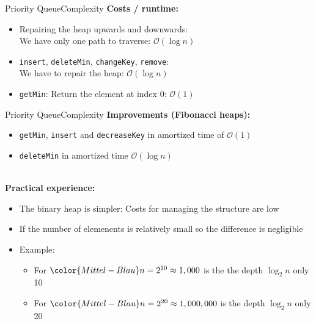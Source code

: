\begin{frame}{Priority Queue}{Complexity}
  \textbf{Costs / runtime:}
  \begin{itemize}
    \item
      Repairing the heap upwards and downwards:\\
      We have only one path to traverse: $\mathcal{O}(\log n)$
    \item
      {\color{Mittel-Blau}\texttt{insert}},
      {\color{Mittel-Blau}\texttt{deleteMin}},
      {\color{Mittel-Blau}\texttt{changeKey}},
      {\color{Mittel-Blau}\texttt{remove}}:\\
      We have to repair the heap: $\mathcal{O}(\log n)$
    \item
      {\color{Mittel-Blau}\texttt{getMin}}:
      Return the element at index 0: $\mathcal{O}(1)$
  \end{itemize}
\end{frame}


\begin{frame}{Priority Queue}{Complexity}
  \textbf{Improvements (Fibonacci heaps):}
  \begin{itemize}
    \item
      {\color{Mittel-Blau}\texttt{getMin}},
      {\color{Mittel-Blau}\texttt{insert}} and
      {\color{Mittel-Blau}\texttt{decreaseKey}}
      in amortized time of $\mathcal{O}(1)$
    \item
      {\color{Mittel-Blau}\texttt{deleteMin}}
      in amortized time $\mathcal{O}(\log n)$
  \end{itemize}
  \hfill\\[0.5em]
  \textbf{Practical experience:}
  \begin{itemize}
    \item
      The binary heap is simpler: Costs for managing the structure are low
    \item
      If the number of elemenents is relatively small so the difference is
      negligible
    \item
      Example:
    \begin{itemize}
      \item
        For ${\color{Mittel-Blau}n = 2^{10}} \approx 1,000$ is the the
        {\color{Mittel-Blau}depth}
        $\log_2 n$ only 10
      \item
        For ${\color{Mittel-Blau}n = 2^{20}} \approx 1,000,000$ is the
        {\color{Mittel-Blau}depth}
        $\log_2 n$ only 20
    \end{itemize}
  \end{itemize}
\end{frame}